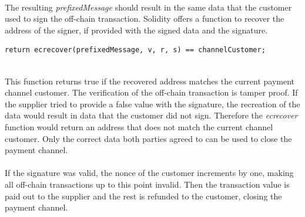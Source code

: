 \leavevmode
\\
The resulting \textit{prefixedMessage} should result in the same data that the customer used to sign the off-chain transaction.
Solidity offers a function to recover the address of the signer, if provided with the signed data and the signature.
\\
\begin{lstlisting}[language=Solidity, numbers=none]
return ecrecover(prefixedMessage, v, r, s) == channelCustomer;
\end{lstlisting}
\leavevmode
\\
This function returns true if the recovered address matches the current payment channel customer.
The verification of the off-chain transaction is tamper proof.
If the supplier tried to provide a false value with the signature, the recreation of the data would result in data that the customer did not sign.
Therefore the \textit{ecrecover} function would return an address that does not match the current channel customer.
Only the correct data both parties agreed to can be used to close the payment channel.
\\\\
If the signature was valid, the nonce of the customer increments by one, making all off-chain transactions up to this point invalid.
Then the transaction value is paid out to the supplier and the rest is refunded to the customer, closing the payment channel.

